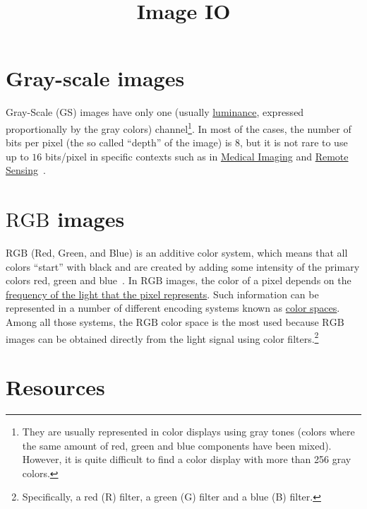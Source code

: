 
\title{Image IO}

\maketitle
\tableofcontents

\section{Gray-scale images}

Gray-Scale (GS) images have only one (usually
\href{https://en.wikipedia.org/wiki/Luminance}{luminance}, expressed
proportionally by the gray colors) channel\footnote{They are usually
represented in color displays using gray tones (colors where the same
amount of red, green and blue components have been mixed). However, it
is quite difficult to find a color display with more than 256 gray
colors.}. In most of the cases, the number of bits per pixel (the so
called ``depth'' of the image) is $8$, but it is not rare to use up to
$16$ bits/pixel in specific contexts such as in
\href{https://en.wikipedia.org/wiki/Medical_imaging}{Medical Imaging}
and \href{https://en.wikipedia.org/wiki/Remote_sensing}{Remote
  Sensing}~\cite{burger2016digital}.

\section{$\text{RGB}$ images}

$\text{RGB}$ (Red, Green, and Blue) is an additive color system, which
means that all colors ``start'' with black and are created by adding
some intensity of the primary colors red, green and
blue~\cite{burger2016digital}. In $\text{RGB}$ images, the color of a
pixel depends on the
\href{https://en.wikipedia.org/wiki/Visible_spectrum}{frequency of the
  light that the pixel represents}. Such information can be
represented in a number of different encoding systems known as
\href{https://en.wikipedia.org/wiki/Color_space}{color spaces}. Among
all those systems, the $\text{RGB}$ color space is the most used
because $\text{RGB}$ images can be obtained directly from the light
signal using color filters.\footnote{Specifically, a red (R) filter, a
green (G) filter and a blue (B) filter.}

\section{Resources}

\renewcommand{\addcontentsline}[3]{} %

